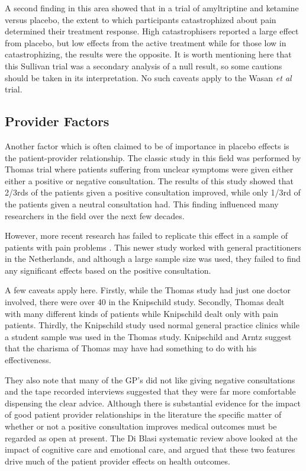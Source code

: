 A second finding in this area \cite{Sullivan2008}  showed that in a trial of amyltriptine and ketamine versus placebo, the extent to which participants catastrophized about pain determined their treatment response. High catastrophisers reported a large effect from placebo, but low effects from the active treatment while for those low in catastrophizing, the results were the opposite. It is worth mentioning here that this Sullivan trial was a secondary analysis of a null result, so some cautions should be taken in its interpretation. No such caveats apply to the Wasan \textit{et al} trial. 




\subsection{Provider Factors}

Another factor which is often claimed to be of importance in placebo effects is the patient-provider relationship. The classic study in this field was performed by Thomas \cite{Thomas1994}  trial where  patients suffering from unclear symptoms were given either either a positive or negative consultation.  The results of this study showed that 2/3rds of the patients given a positive consultation improved, while only 1/3rd of the patients given a neutral consultation had. This finding influenced many researchers in the field over the next few decades. 

However, more recent research has failed to replicate this effect in a sample of patients with pain problems \cite{Knipschild2005}. This newer study worked with general practitioners in the Netherlands, and although a large sample size was used, they failed to find any significant effects based on the positive consultation. 

A few caveats apply here. Firstly, while the Thomas study had just one doctor involved, there were over 40 in the Knipschild study. Secondly, Thomas dealt with many different kinds of patients while Knipschild dealt only with pain patients. Thirdly, the Knipschild study used normal general practice clinics while a student sample was used in the Thomas study. Knipschild and Arntz suggest that the charisma of Thomas may have had something to do with his effectiveness. 

They also note that many of the GP's did not like giving negative consultations and the tape recorded interviews suggested that they were far more comfortable dispensing the clear advice.  Although there is substantial evidence for the impact of good patient provider relationships in the literature \cite{blasi2001influence}  the specific matter of whether or not a positive consultation improves medical outcomes must be regarded as open at present. The Di Blasi systematic review above looked at the impact of cognitive care and emotional care, and argued that these two features drive much of the patient provider effects on health outcomes. 

